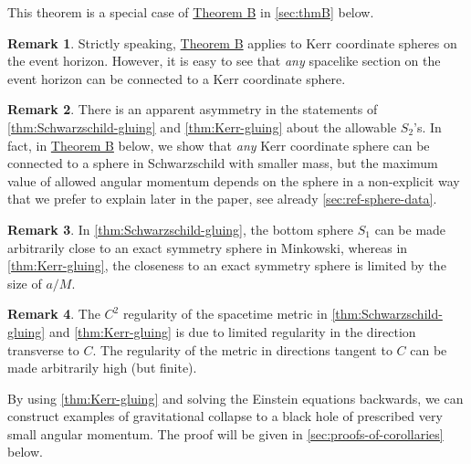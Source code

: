\documentclass[10pt]{article}
\numberwithin{equation}{section}
\theoremstyle{plain}
\theoremstyle{definition}
\newtheorem{rk}{Remark}[section]
\begin{document}
This theorem is a special case of \hyperlink{thmB}{Theorem B} in \cref{sec:thmB} below.

\begin{rk}
    Strictly speaking, \hyperlink{thmB}{Theorem B} applies to Kerr coordinate spheres on the event horizon. However, it is easy to see that \emph{any} spacelike section on the event horizon can be connected to a Kerr coordinate sphere. 
\end{rk}

\begin{rk}
    There is an apparent asymmetry in the statements of \cref{thm:Schwarzschild-gluing} and \cref{thm:Kerr-gluing} about the allowable $S_2$'s. In fact, in \hyperlink{thmB}{Theorem B} below, we show that \emph{any} Kerr coordinate sphere can be connected to a sphere in Schwarzschild with smaller mass, but the maximum value of allowed angular momentum depends on the sphere in a non-explicit way that we prefer to explain later in the paper, see already  \cref{sec:ref-sphere-data}.
\end{rk}

\begin{rk}
    In \cref{thm:Schwarzschild-gluing}, the bottom sphere $S_1$ can be made arbitrarily close to an exact symmetry sphere in Minkowski, whereas in \cref{thm:Kerr-gluing}, the closeness to an exact symmetry sphere is limited by the size of $a/M$.
\end{rk}

\begin{rk}
The $C^2$ regularity of the spacetime metric in \cref{thm:Schwarzschild-gluing} and \cref{thm:Kerr-gluing} is due to limited regularity in the direction transverse to $C$. The regularity of the metric in directions tangent to $C$ can be made arbitrarily high (but finite). 
\end{rk}

By using \cref{thm:Kerr-gluing} and solving the Einstein equations backwards, we can construct examples of gravitational collapse to a black hole of prescribed very small angular momentum. The proof will be given in \cref{sec:proofs-of-corollaries} below. 
\end{document}
